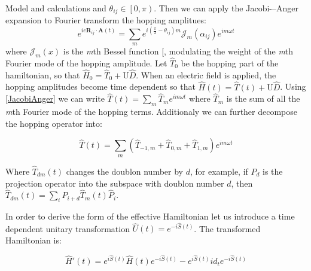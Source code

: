 \documentclass[aps,prl,twocolumn,amsmath,amssymb,superscriptaddress,nobibnotes]{revtex4}%
\renewcommand{\cite}[1]{{[}\onlinecite{#1}{]}}
\newcommand{\bs}{\boldsymbol}
\begin{document}
\begin{section}{Model and calculations}
and $\theta_{ij} \in \left[0,\pi\right)$. Then we can apply the Jacobi-–Anger expansion to Fourier transform the hopping amplitues:
\begin{equation}
\label{JacobiAnger}
e^{ie\bs{R}_{ij}\cdot\bs{A}(t)} = \sum_m e^{i(\frac{\pi}{2}-\theta_{ij})m} \mathcal{J}_m(\alpha_{ij}) e^{im\omega t} 
\end{equation}
where $\mathcal{J}_m(x)$ is the \textit{m}th Bessel function \cite{Kitamura2017}, modulating the weight of the \textit{m}th Fourier mode of the hopping amplitude. Let $\hat{T}_0$ be the hopping part of the hamiltonian, so that $\hat{H}_0 = \hat{T}_0 + \text{U}\hat{D}$. When an electric field is applied, the hopping amplitudes become time dependent so that $\hat{H}(t) = \hat{T}(t) +  \text{U}\hat{D}$. Using \ref{JacobiAnger} we can write $\hat{T}(t) = \sum_m \hat{T}_m e^{im \omega t}$ where $\hat{T}_m$ is the sum of all the \textit{m}th Fourier mode of the hopping terms. Additionaly we can further decompose the hopping operator into:

\begin{equation}
\hat{T}(t) = \sum_m (\hat{T}_{-1,m}+\hat{T}_{0,m}+\hat{T}_{1,m})e^{im\omega t}
\end{equation}

Where $\hat{T}_{dm}(t)$ changes the doublon number by $d$, for example, if $\hat{P}_d$ is the projection operator into the subspace with doublon number $d$, then $\hat{T}_{dm}(t) = \sum_i \hat{P}_{i+d}\hat{T}_{m}(t)\hat{P}_i$.

In order to derive the form of the effective Hamiltonian let us introduce a time dependent unitary transformation $\hat{U}(t) = e^{-i\hat{S}(t)}$. The transformed Hamiltonian is:

\begin{equation}
\hat{H}'(t) = e^{i\hat{S}(t)} \hat{H}(t) e^{-i\hat{S}(t)} - e^{i\hat{S}(t)} id_t e^{-i\hat{S}(t)}
\label{Htransformed}
\end{equation} 


\end{section}
\end{document}
